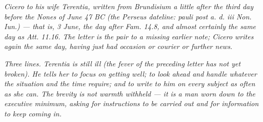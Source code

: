 
\textit{Cicero to his wife Terentia, written from
Brundisium a little after the third day before the
Nones of June 47 BC (the Perseus dateline:
\textit{pauli post a. d. iii Non. Iun.}) --- that is,
3 June, the day after \textit{Fam.} 14.8, and almost
certainly the same day as \textit{Att.} 11.16. The
letter is the pair to a missing earlier note; Cicero
writes again the same day, having just had occasion or
courier or further news.}

\textit{Three lines. Terentia is still ill (the fever
of the preceding letter has not yet broken). He tells
her to focus on getting well; to look ahead and handle
whatever the situation and the time require; and to
write to him on every subject as often as she can.
The brevity is not warmth withheld --- it is a man
worn down to the executive minimum, asking for
instructions to be carried out and for information to
keep coming in.}

